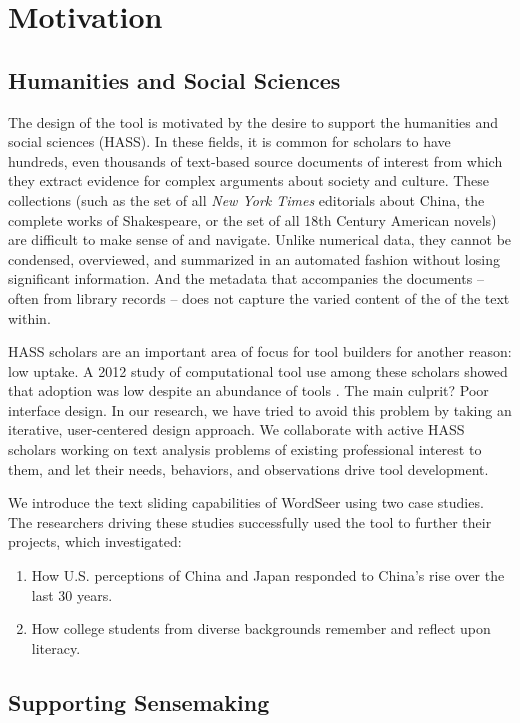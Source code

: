 \documentclass{sig-alternate}
\begin{document}
\section{Motivation}

\subsection{Humanities and Social Sciences}
The design of the tool is motivated by the desire to support the humanities and social sciences (HASS). In these fields, it is common for scholars to have hundreds, even thousands of text-based source documents of interest from which they extract evidence for complex arguments about society and culture. These collections (such as the set of all \emph{New York Times} editorials about China, the complete works of Shakespeare, or the set of all 18th Century American novels)  are difficult to make sense of and navigate. Unlike numerical data, they cannot be condensed, overviewed, and summarized in an automated fashion without losing significant information. And the metadata that accompanies the documents -- often from library records -- does not capture the varied content of the of the text within.

HASS scholars are an important area of focus for tool builders for another reason: low uptake. A 2012 study of computational tool use among these scholars showed that adoption was low despite an abundance of tools \cite{gibbs_building_2012}. The main culprit? Poor interface design. In our research, we have tried to avoid this problem by taking an iterative, user-centered design approach. We collaborate with active HASS scholars working on text analysis problems of existing professional interest to them, and let their needs, behaviors, and observations drive tool development.

We introduce the text sliding capabilities of WordSeer using two case studies. The researchers driving these studies successfully used the tool to further their projects, which investigated:
\begin{enumerate}
	\item How U.S. perceptions of China and Japan responded to China's rise over the last 30 years.
	\item How college students from diverse backgrounds remember and reflect upon literacy.
\end{enumerate}


\subsection{Supporting Sensemaking}
\end{document}
